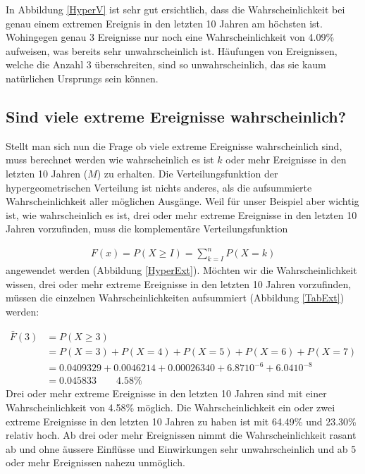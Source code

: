 \begin{refsection}
In Abbildung \ref{HyperV} ist sehr gut ersichtlich, dass die Wahrscheinlichkeit bei genau einem extremen Ereignis in den letzten 10 Jahren am höchsten ist. Wohingegen genau 3 Ereignisse nur noch eine Wahrscheinlichkeit von 4.09\% aufweisen, was bereits sehr unwahrscheinlich ist. Häufungen von Ereignissen, welche die Anzahl 3 überschreiten, sind so unwahrscheinlich, das sie kaum natürlichen Ursprungs sein können.

\subsection{Sind viele extreme Ereignisse wahrscheinlich?}
Stellt man sich nun die Frage ob viele extreme Ereignisse wahrscheinlich sind, muss berechnet werden wie wahrscheinlich es ist $k$ oder mehr Ereignisse in den letzten 10 Jahren ($M$) zu erhalten. 
Die Verteilungsfunktion der hypergeometrischen Verteilung ist nichts anderes, als die aufsummierte Wahrscheinlichkeit aller möglichen Ausgänge. Weil für unser Beispiel aber wichtig ist, wie wahrscheinlich es ist, drei oder mehr extreme Ereignisse in den letzten 10 Jahren vorzufinden, muss die komplementäre Verteilungsfunktion 

\begin{align*}
F(x) = P(X \ge I ) = \sum \limits_{k=I}^n P(X = k)
\end{align*}
%
angewendet werden (Abbildung \ref{HyperExt}). 
Möchten wir die Wahrscheinlichkeit wissen, drei oder mehr extreme Ereignisse in den letzten 10 Jahren vorzufinden, müssen die einzelnen Wahrscheinlichkeiten aufsummiert (Abbildung \ref{TabExt}) werden:

\begin{align*}
\bar{F}(3) &=  P(X {\ge} 3) \\
&= P(X = 3) + P(X = 4) + P(X = 5) + P(X = 6) + P(X = 7) \\
&= 0.0409329 + 0.0046214 + 0.00026340 + 6.87 10^{ -6 } + 6.04 10^{ -8 } \\
&= 0.045833 \quad \quad  4.58\%
\end{align*}
%
Drei oder mehr extreme Ereignisse in den letzten 10 Jahren sind mit einer Wahrscheinlichkeit von 4.58\% möglich. 
Die Wahrscheinlichkeit ein oder zwei extreme Ereignisse in den letzten 10 Jahren zu haben ist mit 64.49\% und 23.30\% relativ hoch. Ab drei oder mehr Ereignissen nimmt die Wahrscheinlichkeit rasant ab und ohne äussere Einflüsse und Einwirkungen sehr unwahrscheinlich und ab 5 oder mehr Ereignissen nahezu unmöglich.


\end{refsection}
